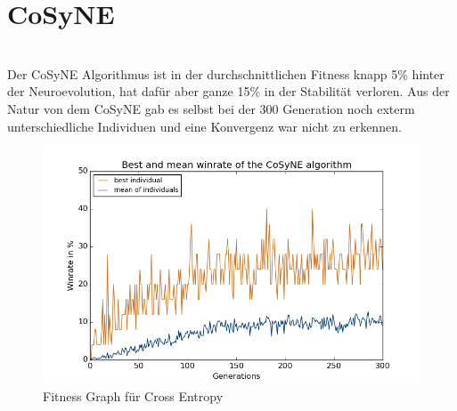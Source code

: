             \section{CoSyNE}
                \begin{multicols}{2}
                    \noindent
                    \\[5mm]
                    Der CoSyNE Algorithmus ist in der durchschnittlichen Fitness knapp 5\% hinter der Neuroevolution, hat dafür aber ganze 15\% in der Stabilität verloren. Aus der Natur von dem CoSyNE gab es selbst bei der 300 Generation noch exterm unterschiedliche Individuen und eine Konvergenz war nicht zu erkennen. 
                    \begin{figure}[H]
                       \includegraphics[scale=0.5]{../pictures/summary/cosyne-fitness.png}
                       \caption{Fitness Graph für Cross Entropy}\label{fig:graph-co}
                    \end{figure}
                \end{multicols}

